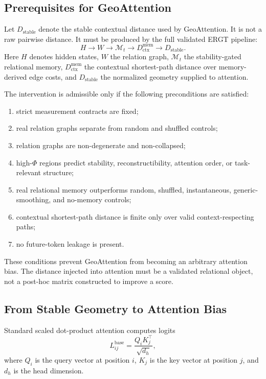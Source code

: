 \documentclass[11pt]{article}
\begin{document}
\subsection{Prerequisites for GeoAttention}

Let $D_{\mathrm{stable}}$ denote the stable contextual distance used by GeoAttention. It is not a raw pairwise distance. It must be produced by the full validated ERGT pipeline:
\[
H
\rightarrow
W
\rightarrow
\mathcal{M}_t
\rightarrow
D_{\mathrm{ctx}}^{\mathrm{mem}}
\rightarrow
D_{\mathrm{stable}}.
\]
Here $H$ denotes hidden states, $W$ the relation graph, $\mathcal{M}_t$ the stability-gated relational memory, $D_{\mathrm{ctx}}^{\mathrm{mem}}$ the contextual shortest-path distance over memory-derived edge costs, and $D_{\mathrm{stable}}$ the normalized geometry supplied to attention.

The intervention is admissible only if the following preconditions are satisfied:
\begin{enumerate}[label=(\roman*)]
    \item strict measurement contracts are fixed;
    \item real relation graphs separate from random and shuffled controls;
    \item relation graphs are non-degenerate and non-collapsed;
    \item high-$\Phi$ regions predict stability, reconstructibility, attention order, or task-relevant structure;
    \item real relational memory outperforms random, shuffled, instantaneous, generic-smoothing, and no-memory controls;
    \item contextual shortest-path distance is finite only over valid context-respecting paths;
    \item no future-token leakage is present.
\end{enumerate}

These conditions prevent GeoAttention from becoming an arbitrary attention bias. The distance injected into attention must be a validated relational object, not a post-hoc matrix constructed to improve a score.

\subsection{From Stable Geometry to Attention Bias}

Standard scaled dot-product attention computes logits
\[
L_{ij}^{\mathrm{base}}
=
\frac{Q_iK_j^\top}{\sqrt{d_h}},
\]
where $Q_i$ is the query vector at position $i$, $K_j$ is the key vector at position $j$, and $d_h$ is the head dimension.
\end{document}
